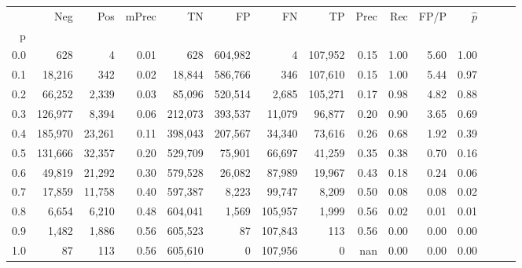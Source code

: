 \begin{tabular}{rrrrrrrrrrrrrrr}
\toprule
{} &      Neg &     Pos & mPrec &       TN &       FP &       FN &       TP &  Prec &   Rec &  FP/P & $\hat{p}$ \\
p   &          &         &       &          &          &          &          &       &       &       &           \\
\midrule
0.0 &      628 &       4 &  0.01 &      628 &  604,982 &        4 &  107,952 &  0.15 &  1.00 &  5.60 &      1.00 \\
0.1 &   18,216 &     342 &  0.02 &   18,844 &  586,766 &      346 &  107,610 &  0.15 &  1.00 &  5.44 &      0.97 \\
0.2 &   66,252 &   2,339 &  0.03 &   85,096 &  520,514 &    2,685 &  105,271 &  0.17 &  0.98 &  4.82 &      0.88 \\
0.3 &  126,977 &   8,394 &  0.06 &  212,073 &  393,537 &   11,079 &   96,877 &  0.20 &  0.90 &  3.65 &      0.69 \\
0.4 &  185,970 &  23,261 &  0.11 &  398,043 &  207,567 &   34,340 &   73,616 &  0.26 &  0.68 &  1.92 &      0.39 \\
0.5 &  131,666 &  32,357 &  0.20 &  529,709 &   75,901 &   66,697 &   41,259 &  0.35 &  0.38 &  0.70 &      0.16 \\
0.6 &   49,819 &  21,292 &  0.30 &  579,528 &   26,082 &   87,989 &   19,967 &  0.43 &  0.18 &  0.24 &      0.06 \\
0.7 &   17,859 &  11,758 &  0.40 &  597,387 &    8,223 &   99,747 &    8,209 &  0.50 &  0.08 &  0.08 &      0.02 \\
0.8 &    6,654 &   6,210 &  0.48 &  604,041 &    1,569 &  105,957 &    1,999 &  0.56 &  0.02 &  0.01 &      0.01 \\
0.9 &    1,482 &   1,886 &  0.56 &  605,523 &       87 &  107,843 &      113 &  0.56 &  0.00 &  0.00 &      0.00 \\
1.0 &       87 &     113 &  0.56 &  605,610 &        0 &  107,956 &        0 &   nan &  0.00 &  0.00 &      0.00 \\
\bottomrule
\end{tabular}
